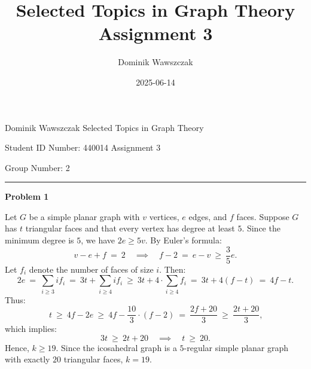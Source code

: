 \documentclass[12pt]{article}
\title{Selected Topics in Graph Theory Assignment 3}
\author{Dominik Wawszczak}
\date{2025-06-14}
\begin{document}
	\setlength{\parindent}{0 cm}
	
	Dominik Wawszczak \hfill Selected Topics in Graph Theory
	
	Student ID Number: 440014 \hfill Assignment 3
	
	Group Number: 2
	
	\bigskip
	\hrule
	\bigskip
	
	\textbf{Problem 1}
	
	\medskip
	
	Let \(G\) be a simple planar graph with \(v\) vertices, \(e\) edges, and
	\(f\) faces. Suppose \(G\) has \(t\) triangular faces and that every vertex
	has degree at least \(5\). Since the minimum degree is \(5\), we have \(2 e
	\geqslant 5 v\). By Euler's formula:
	\[
		v - e + f \ = \ 2 \quad \implies \quad f - 2 \ = \ e - v \ \geqslant \
		\frac{3}{5} e \text{.}
	\]
	Let \(f_{i}\) denote the number of faces of size \(i\). Then:
	\[
		2 e \ = \ \sum\limits_{i \geqslant 3} i f_{i} \ = \ 3 t +
		\sum\limits_{i \geqslant 4} i f_{i} \ \geqslant \ 3 t + 4 \cdot
		\sum\limits_{i \geqslant 4} f_{i} \ = \ 3 t + 4 (f - t) \ = \ 4 f - t
		\text{.}
	\]
	Thus:
	\[
		t \ \geqslant \ 4 f - 2 e \ \geqslant \ 4 f - \frac{10}{3} \cdot (f - 2)
		\ = \ \frac{2 f + 20}{3} \ \geqslant \ \frac{2 t + 20}{3} \text{,}
	\]
	which implies:
	\[
		3 t \ \geqslant \ 2 t + 20 \quad \implies \quad t \ \geqslant \ 20
		\text{.}
	\]
	Hence, \(k \geqslant 19\). Since the icosahedral graph is a \(5\)-regular
	simple planar graph with exactly \(20\) triangular faces, \(k = 19\).
\end{document}
